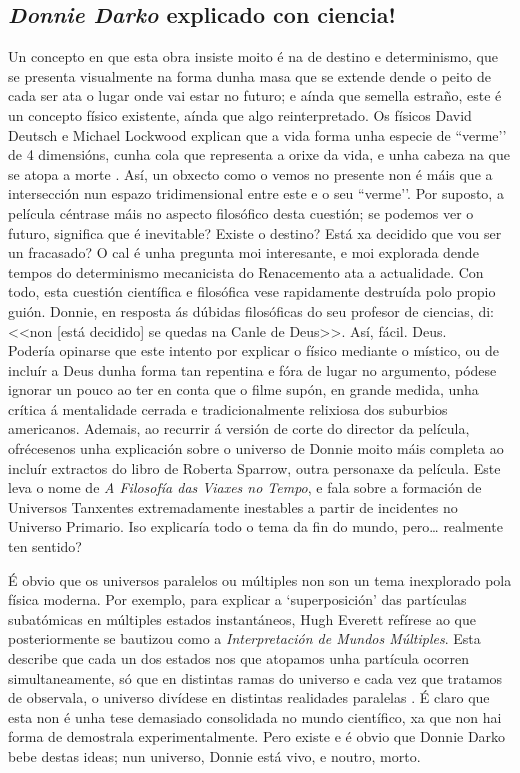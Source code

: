 \begin{refsection}
\begin{multicols}{2}
\subsection*{\textit{Donnie Darko} explicado con ciencia!}

Un concepto en que esta obra insiste moito é na de destino e determinismo, que
se presenta visualmente na forma dunha masa que se extende dende o peito de
cada ser ata o lugar onde vai estar no futuro; e aínda que semella estraño,
este é un concepto físico existente, aínda que algo reinterpretado. Os físicos
David Deutsch e Michael Lockwood explican que a vida forma unha especie de
``verme’' de 4 dimensións, cunha cola que representa a orixe da vida, e unha
cabeza na que se atopa a morte \cite{deutsch.m_1994}. Así, un obxecto como
o vemos no presente non é máis que a intersección nun espazo tridimensional
entre este e o seu ``verme'’.  Por suposto, a película céntrase máis no aspecto
filosófico desta cuestión; se podemos ver o futuro, significa que é inevitable?
Existe o destino? Está xa decidido que vou ser un fracasado? O cal é unha
pregunta moi interesante, e moi explorada dende tempos do determinismo
mecanicista do Renacemento ata a actualidade. Con todo, esta cuestión
científica e filosófica vese rapidamente destruída polo propio guión. Donnie,
en resposta ás dúbidas filosóficas do seu profesor de ciencias, di: <<non [está
decidido] se quedas na Canle de Deus>>\cite{donnie_darko}.
Así, fácil. Deus.\\

Podería opinarse que este intento por explicar o físico mediante o místico, ou
de incluír a Deus dunha forma tan repentina e fóra de lugar no argumento,
pódese ignorar un pouco ao ter en conta que o filme supón, en grande medida,
unha crítica á mentalidade cerrada e tradicionalmente relixiosa dos suburbios
americanos. Ademais, ao recurrir á versión de corte do director da película,
ofrécesenos unha explicación sobre o universo de Donnie moito máis completa ao
incluír extractos do libro de Roberta Sparrow, outra personaxe da película.
Este leva o nome de \textit{A Filosofía das Viaxes no Tempo}, e fala sobre a
formación de Universos Tanxentes extremadamente inestables a partir de
incidentes no Universo Primario. Iso explicaría todo o tema da fin do mundo,
pero… realmente ten sentido?

É obvio que os universos paralelos ou múltiples non son un tema inexplorado
pola física moderna. Por exemplo, para explicar a `superposición’ das
partículas subatómicas en múltiples estados instantáneos, Hugh Everett refírese
ao que posteriormente se bautizou como a \textit{Interpretación de Mundos
Múltiples}. Esta describe que cada un dos estados nos que atopamos unha
partícula ocorren simultaneamente, só que en distintas ramas do universo e cada
vez que tratamos de observala, o universo divídese en distintas realidades
paralelas \cite{gribbin2004historia}. É claro que esta non é unha tese demasiado
consolidada no mundo científico, xa que non hai forma de demostrala
experimentalmente. Pero existe e é obvio que Donnie Darko bebe destas ideas;
nun universo, Donnie está vivo, e noutro, morto.


\end{multicols}
\end{refsection}
